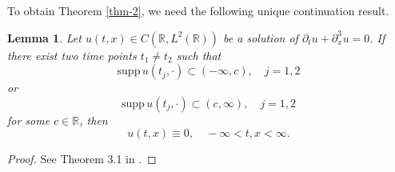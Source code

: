 \documentclass[preprint,12pt]{elsarticle}
\def\R {\mathbb{R}}
\newtheorem{lemma}{Lemma}[section]
\begin{document}
To obtain Theorem \ref{thm-2}, we need the following unique continuation result.
\begin{lemma}\label{lem-ucp}
    Let $u(t,x)\in C(\R, L^2(\R))$ be a  solution of $\partial_tu+\partial_x^3u=0$. If there exist two time points $t_1\neq t_2$ such that
    \begin{equation}
        \mathrm{supp }\, u(t_j,\cdot)\subset (-\infty,c),\quad j=1,2
    \end{equation}
    or
    \begin{equation}
        \mathrm{supp }\, u(t_j,\cdot)\subset (c,\infty),\quad j=1,2
    \end{equation}
    for some $c\in \R$, then
    $$
        u(t,x)\equiv 0,\quad -\infty <t,x<\infty.
    $$
\end{lemma}
\begin{proof}
See Theorem 3.1 in \cite[p.~60]{zhang-kdv}.
\end{proof}
\end{document}
